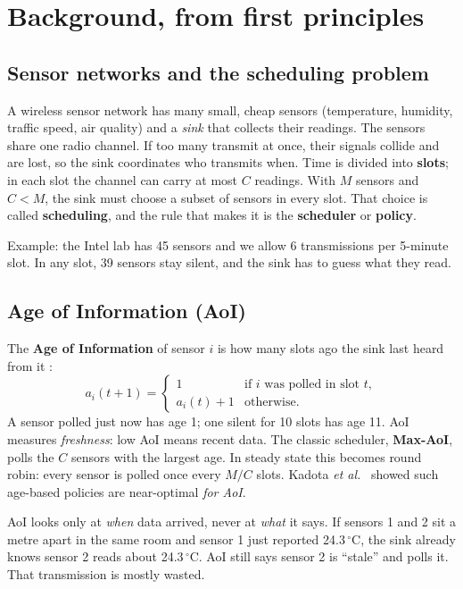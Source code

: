 \section{Background, from first principles}

\subsection{Sensor networks and the scheduling problem}

A wireless sensor network has many small, cheap sensors (temperature, humidity, traffic speed, air quality) and a
\emph{sink} that collects their readings. The sensors share one radio channel. If too many transmit at once, their
signals collide and are lost, so the sink coordinates who transmits when. Time is divided into \textbf{slots}; in
each slot the channel can carry at most $C$ readings. With $M$ sensors and $C<M$, the sink must choose a subset of
sensors in every slot. That choice is called \textbf{scheduling}, and the rule that makes it is the
\textbf{scheduler} or \textbf{policy}.

Example: the Intel lab has 45 sensors and we allow 6 transmissions per 5-minute slot. In any slot, 39 sensors stay
silent, and the sink has to guess what they read.

\subsection{Age of Information (AoI)}

The \textbf{Age of Information} of sensor $i$ is how many slots ago the sink last heard from it \cite{15,14}:
\[
  a_i(t+1)=\begin{cases}1 & \text{if } i \text{ was polled in slot } t,\\ a_i(t)+1 & \text{otherwise.}\end{cases}
\]
A sensor polled just now has age 1; one silent for 10 slots has age 11. AoI measures \emph{freshness}: low AoI
means recent data. The classic scheduler, \textbf{Max-AoI}, polls the $C$ sensors with the largest age. In steady
state this becomes round robin: every sensor is polled once every $M/C$ slots. Kadota \emph{et al.}\ \cite{16}
showed such age-based policies are near-optimal \emph{for AoI}.

\begin{notebox}
AoI looks only at \emph{when} data arrived, never at \emph{what} it says. If sensors 1 and 2 sit a metre apart in the
same room and sensor 1 just reported 24.3\,$^\circ$C, the sink already knows sensor 2 reads about 24.3\,$^\circ$C. AoI still
says sensor 2 is ``stale'' and polls it. That transmission is mostly wasted.
\end{notebox}

